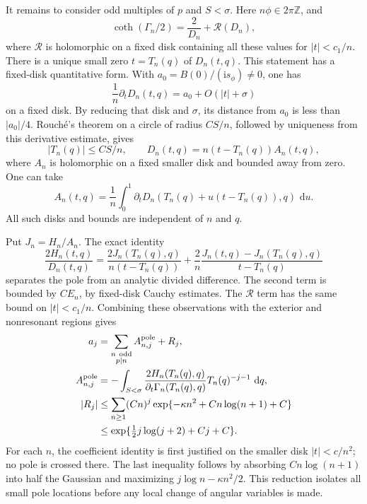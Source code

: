 \documentclass[11pt]{article}
\numberwithin{equation}{section}
\theoremstyle{definition}
\newcommand{\Z}{\mathbb Z}
\newcommand{\ii}{\mathrm i}
\newcommand{\dd}{\,\mathrm d}
\begin{document}
It remains to consider odd multiples of \(p\) and \(S<\sigma\).
Here \(n\phi\in2\pi\Z\), and
\[
 \coth(\Gamma_n/2)=\frac2{D_n}+\mathcal R(D_n),
 \]
where \(\mathcal R\) is holomorphic on a fixed disk containing all
these values for \(|t|<c_1/n\).
There is a unique small zero \(t=T_n(q)\) of \(D_n(t,q)\).
This statement has a fixed-disk quantitative form.  With
\(a_0=B(0)/(\ii s_\phi)\ne0\), one has
\[
 \frac1n\partial_tD_n(t,q)=a_0+O(|t|+\sigma)
 \]
on a fixed disk.  By reducing that disk and \(\sigma\), its
distance from \(a_0\) is less than \(|a_0|/4\).  Rouch\'e's
theorem on a circle of radius \(CS/n\), followed by uniqueness
from this derivative estimate, gives
\begin{equation}
 |T_n(q)|\le CS/n,\qquad
 D_n(t,q)=n(t-T_n(q))A_n(t,q),
 \label{neg:pole-factor}
\end{equation}
where \(A_n\) is holomorphic on a fixed smaller disk and bounded
away from zero.  One can take
\[
 A_n(t,q)=\frac1n\int_0^1
   \partial_tD_n(T_n(q)+u(t-T_n(q)),q)\,\dd u .
 \]
All such disks and bounds are independent of \(n\) and \(q\).

Put \(J_n=H_n/A_n\).  The exact identity
\begin{equation}
 \frac{2H_n(t,q)}{D_n(t,q)}
 =\frac{2J_n(T_n(q),q)}{n(t-T_n(q))}
  +\frac2n
     \frac{J_n(t,q)-J_n(T_n(q),q)}{t-T_n(q)}
 \label{neg:division}
\end{equation}
separates the pole from an analytic divided difference.
The second term is bounded by \(CE_n\), by fixed-disk Cauchy
estimates.  The \(\mathcal R\) term has the same bound on
\(|t|<c_1/n\).  Combining these observations with the exterior
and nonresonant regions gives
\begin{align}
 a_j&=
 \sum_{\substack{n\ {\rm odd}\\p\mid n}}A^{\rm pole}_{n,j}+R_j,
 \label{neg:all-poles}\\
 A^{\rm pole}_{n,j}
 &=-\int_{S<\sigma}
   \frac{2H_n(T_n(q),q)}
        {\partial_t\Gamma_n(T_n(q),q)}
   T_n(q)^{-j-1}\,\dd q ,
 \label{neg:pole-coefficient}\\
 |R_j|
 &\le \sum_{n\ge1}(Cn)^j
             \exp\{-\kappa n^2+C n\log(n+1)+C\}\\
 &\le
 \exp\{\tfrac12 j\log(j+2)+Cj+C\}.
 \label{neg:regular-remainder}
\end{align}
For each \(n\), the coefficient identity is first justified on
the smaller disk \(|t|<c/n^2\); no pole is crossed there.
The last inequality follows by absorbing \(Cn\log(n+1)\) into
half the Gaussian and maximizing \(j\log n-\kappa n^2/2\).
This reduction isolates all small pole locations before any local
change of angular variables is made.
\end{document}
